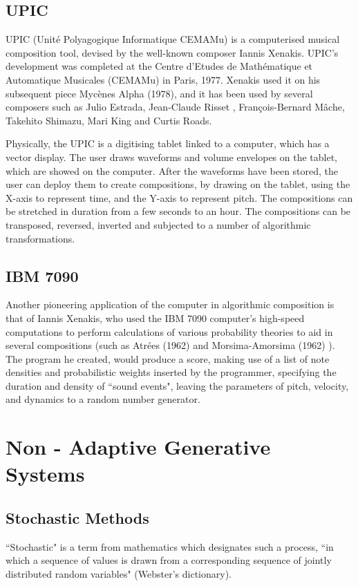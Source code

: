     
    \subsection{UPIC}
    UPIC (Unité Polyagogique Informatique CEMAMu) is a computerised musical composition tool, devised by the well-known composer Iannis Xenakis. UPIC's development was completed at the Centre d'Etudes de Mathématique et Automatique Musicales (CEMAMu) in Paris, 1977. Xenakis used it on his subsequent piece Mycènes Alpha (1978), and it has been used by several composers such as Julio Estrada, Jean-Claude Risset , François-Bernard Mâche, Takehito Shimazu, Mari King and Curtis Roads.

    Physically, the UPIC is a digitising tablet linked to a computer, which has a vector display. The user draws waveforms and volume envelopes on the tablet, which are showed on the computer. After the waveforms have been stored, the user can deploy them to create compositions, by drawing on the tablet, using the X-axis to represent time, and the Y-axis to represent pitch. The compositions can be stretched in duration from a few seconds to an hour. The compositions can be transposed, reversed, inverted and subjected to a number of algorithmic transformations. 

    \subsection{IBM 7090}
    Another pioneering application of the computer in algorithmic composition is that of Iannis Xenakis, who used the IBM 7090 computer's high-speed computations to perform calculations of various probability theories to aid in several compositions (such as Atrées (1962) and Morsima-Amorsima (1962) ). The program he created, would produce a score, making use of a list of note densities and probabilistic weights inserted by the programmer, specifying the duration and density of ``sound events", leaving the parameters of pitch, velocity, and dynamics to a random number generator. 


    \section{Non - Adaptive Generative Systems}
    
        \subsection{Stochastic Methods} \label{subsec:stochastic_methods}
        ``Stochastic" is a term from mathematics which designates such a process, ``in which a sequence of values is drawn from a corresponding sequence of jointly distributed random variables" (Webster's dictionary).
        
